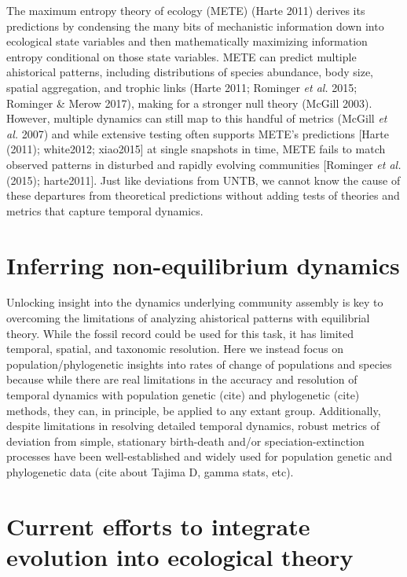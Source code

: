 \documentclass[
]{article}
\begin{document}
The maximum entropy theory of ecology (METE) (Harte 2011) derives its
predictions by condensing the many bits of mechanistic information down
into ecological state variables and then mathematically maximizing
information entropy conditional on those state variables. METE can
predict multiple ahistorical patterns, including distributions of
species abundance, body size, spatial aggregation, and trophic links
(Harte 2011; Rominger \emph{et al.} 2015; Rominger \& Merow 2017),
making for a stronger null theory (McGill 2003). However, multiple
dynamics can still map to this handful of metrics (McGill \emph{et al.}
2007) and while extensive testing often supports METE's predictions
{[}Harte (2011); white2012; xiao2015{]} at single snapshots in time,
METE fails to match observed patterns in disturbed and rapidly evolving
communities {[}Rominger \emph{et al.} (2015); harte2011{]}. Just like
deviations from UNTB, we cannot know the cause of these departures from
theoretical predictions without adding tests of theories and metrics
that capture temporal dynamics.

\hypertarget{inferring-non-equilibrium-dynamics}{%
\section{Inferring non-equilibrium
dynamics}\label{inferring-non-equilibrium-dynamics}}

Unlocking insight into the dynamics underlying community assembly is key
to overcoming the limitations of analyzing ahistorical patterns with
equilibrial theory. While the fossil record could be used for this task,
it has limited temporal, spatial, and taxonomic resolution. Here we
instead focus on population/phylogenetic insights into rates of change
of populations and species because while there are real limitations in
the accuracy and resolution of temporal dynamics with population genetic
(cite) and phylogenetic (cite) methods, they can, in principle, be
applied to any extant group. Additionally, despite limitations in
resolving detailed temporal dynamics, robust metrics of deviation from
simple, stationary birth-death and/or speciation-extinction processes
have been well-established and widely used for population genetic and
phylogenetic data (cite about Tajima D, gamma stats, etc).

\hypertarget{current-efforts-to-integrate-evolution-into-ecological-theory}{%
\section{Current efforts to integrate evolution into ecological
theory}\label{current-efforts-to-integrate-evolution-into-ecological-theory}}
\end{document}
